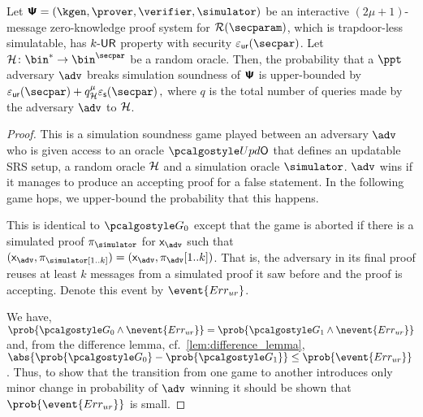 \begin{theorem}
	\label{thm:simsnd}
	Let $\ps = (\kgen, \prover, \verifier, \simulator)$ be an interactive $(2 \mu + 1)$-message
	zero-knowledge proof system for $\RELGEN(\secparam)$, which is trapdoor-less simulatable, has
	${k\text{-}\mathsf{UR}}$ property with security $\epsur(\secpar)$. Let $\ro\colon \bin^{*} \to \bin^{\secpar}$ be a random oracle. Then, the
	probability that a $\ppt$ adversary $\adv$ breaks simulation soundness of
	$\bm{\mathsf{\Psi}}$ is upper-bounded by
	\(
	\epsur(\secpar) + q_\ro^\mu  \epss(\secpar)\,,
	\)
	where $q$ is the total number of queries made by the adversary $\adv$ to $\mathcal{H}$.
\end{theorem}

\begin{proof}
	 This is a simulation soundness game played between an adversary
	$\advse$ who is given access to an oracle $\initU$ that defines an updatable SRS setup, a random oracle $\mathcal{H}$ and a simulation oracle
	$\simulator$. $\adv$ wins if it manages to produce an accepting proof
	for a false statement. In the following game hops, we upper-bound the
	probability that this happens.
	
	 This is identical to $\game{0}$ except that the game is aborted if
	there is a simulated proof $\zkproof_\simulator$ for $\inp_{\adv}$ such that
	$(\inp_{\adv}, \zkproof_\simulator[1..k]) = (\inp_{\adv},
	\zkproof_{\adv}[1..k])$. That is, the adversary in its final proof reuses at
	least $k$ messages from a simulated proof it saw before and the proof is
	accepting.  Denote this event by $\event{\errur}$.
	
	 We have, \( \prob{\game{0} \land
		\nevent{\errur}} = \prob{\game{1} \land \nevent{\errur}} \) and, from the
	difference lemma, cf.~\cref{lem:difference_lemma},
	$ \abs{\prob{\game{0}} - \prob{\game{1}}} \leq \prob{\event{\errur}}\,$.
	Thus, to show that the transition from one game to another introduces only
	minor change in probability of $\adv$ winning it should be shown that
	$\prob{\event{\errur}}$ is small.
	

\end{proof}
